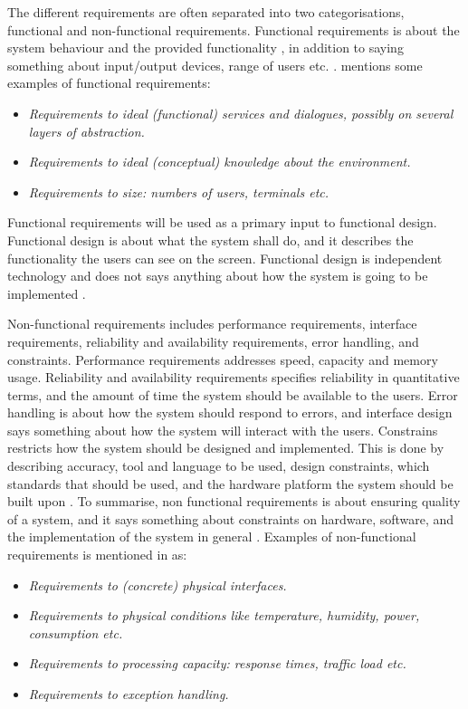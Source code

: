 The different requirements are often separated into two categorisations, functional and non-functional requirements. Functional requirements is about the system behaviour and the provided functionality \cite{systemutviklingDel1}, in addition to saying something about input/output devices, range of users etc. \cite{mmi}. \cite{systemutviklingDel1} mentions some examples of functional requirements:
\begin{itemize}
\item \emph{Requirements to ideal (functional) services and dialogues, possibly on several layers of abstraction.}
\item \emph{Requirements to ideal (conceptual) knowledge about the environment.}
\item \emph{Requirements to size: numbers of users, terminals etc.}
\end{itemize}     

Functional requirements will be used as a primary input to functional design. Functional design is about what the system shall do, and it describes the functionality the users can see on the screen. Functional design is independent technology and does not says anything about how the system is going to be implemented \cite{systemutviklingDel1}. 

Non-functional requirements includes performance requirements, interface requirements, reliability and availability requirements, error handling, and constraints. Performance requirements addresses speed, capacity and memory usage. Reliability and availability requirements specifies reliability in quantitative terms, and the amount of time the system should be available to the users. Error handling is about how the system should respond to errors, and interface design says something about how the system will interact with the users. Constrains restricts how the system should be designed and implemented. This is done by describing accuracy, tool and language to be used, design constraints, which standards that should be used, and the hardware platform the system should be built upon \cite{braude2000software}. To summarise, non functional requirements is about ensuring quality of a system, and it says something about constraints on hardware, software, and the implementation of the system in general \cite{mmi}. Examples of non-functional requirements is mentioned in \cite{systemutviklingDel1} as:
\begin{itemize}
\item \emph{Requirements to (concrete) physical interfaces.}
\item \emph{Requirements to physical conditions like temperature, humidity, power, consumption etc.}
\item \emph{Requirements to processing capacity: response times, traffic load etc.}
\item \emph{Requirements to exception handling.} \\ \\ 
\end{itemize}   

